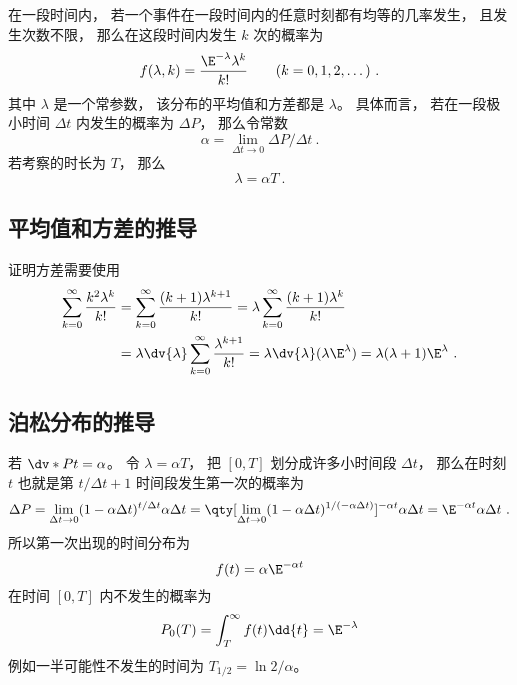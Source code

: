 

在一段时间内， 若一个事件在一段时间内的任意时刻都有均等的几率发生， 且发生次数不限， 那么在这段时间内发生 $k$ 次的概率为
\begin{equation}
f(\lambda, k) = \frac{\E^{-\lambda}\lambda^k}{k!} \qquad (k = 0,1,2,\dots)~.
\end{equation}
其中 $\lambda$ 是一个常参数， 该分布的平均值和方差都是 $\lambda$。 具体而言， 若在一段极小时间 $\Delta t$ 内发生的概率为 $\Delta P$， 那么令常数
\begin{equation}
\alpha = \lim_{\Delta t\to 0}\Delta P/\Delta t~.
\end{equation}
若考察的时长为 $T$， 那么
\begin{equation}
\lambda = \alpha T~.
\end{equation}

\subsection{平均值和方差的推导}
证明方差需要使用
\begin{equation}
\begin{aligned}
\sum_{k=0}^\infty \frac{k^2\lambda^{k}}{k!}
&= \sum_{k=0}^\infty \frac{(k+1)\lambda^{k+1}}{k!}
= \lambda \sum_{k=0}^\infty \frac{(k+1)\lambda^k}{k!}\\
&= \lambda\dv{\lambda} \sum_{k=0}^\infty \frac{\lambda^{k+1}}{k!}
= \lambda \dv{\lambda} (\lambda \E^{\lambda})
= \lambda(\lambda+1)\E^{\lambda}~.
\end{aligned}
\end{equation}

\subsection{泊松分布的推导}
若 $\dv*{P}{t} = \alpha$。 令 $\lambda = \alpha T$， 把 $[0,T]$ 划分成许多小时间段 $\Delta t$， 那么在时刻 $t$ 也就是第 $t/\Delta t+1$ 时间段发生第一次的概率为
\begin{equation}
\Delta P = \lim_{\Delta t\to 0}(1 - \alpha\Delta t)^{t/\Delta t} \alpha\Delta t
= \qty[\lim_{\Delta t\to 0}(1 - \alpha\Delta t)^{1/(-\alpha\Delta t)}]^{-\alpha t} \alpha\Delta t
= \E^{-\alpha t} \alpha \Delta t~.
\end{equation}
所以第一次出现的时间分布为
\begin{equation}
f(t) = \alpha\E^{-\alpha t}
\end{equation}
在时间 $[0,T]$ 内不发生的概率为
\begin{equation}
P_0(T) = \int_{T}^\infty f(t) \dd{t} = \E^{-\lambda}
\end{equation}
例如一半可能性不发生的时间为 $T_{1/2} = \ln 2/\alpha$。

